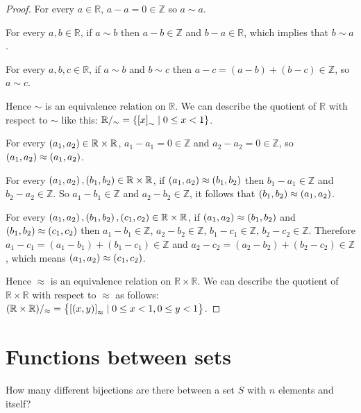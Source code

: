\begin{proof}
	For every $a\in \mathbb{R}$, $a - a = 0 \in \mathbb{Z}$ so $a\sim a$.

	For every $a, b\in\mathbb{R}$, if $a\sim b$ then $a - b\in \mathbb{Z}$ and $b - a\in \mathbb{R}$, which implies that $b\sim a$.

	For every $a, b, c\in\mathbb{R}$, if $a\sim b$ and $b\sim c$ then $a - c = (a - b) + (b - c) \in \mathbb{Z}$, so $a\sim c$.

	Hence $\sim$ is an equivalence relation on $\mathbb{R}$. We can describe the quotient of $\mathbb{R}$ with respect to $\sim$ like this: $\mathbb{R}/_{\sim} = \left\{{{[x]}_{\sim} \mid 0\leq x < 1}\right\}$.

	\bigskip
	For every $\left({a_{1}, a_{2}}\right) \in \mathbb{R}\times\mathbb{R}$, $a_{1} - a_{1} = 0\in \mathbb{Z}$ and $a_{2} - a_{2} = 0\in \mathbb{Z}$, so $\left({a_{1}, a_{2}}\right) \approx \left({a_{1}, a_{2}}\right)$.

	For every $\left({a_{1}, a_{2}}\right), \left({b_{1}, b_{2}}\right) \in \mathbb{R}\times\mathbb{R}$, if $\left({a_{1}, a_{2}}\right) \approx \left({b_{1}, b_{2}}\right)$ then $b_{1} - a_{1}\in \mathbb{Z}$ and $b_{2} - a_{2}\in \mathbb{Z}$. So $a_{1} - b_{1}\in \mathbb{Z}$ and $a_{2} - b_{2}\in \mathbb{Z}$, it follows that $\left({b_{1}, b_{2}}\right) \approx \left({a_{1}, a_{2}}\right)$.

	For every $\left({a_{1}, a_{2}}\right), \left({b_{1}, b_{2}}\right), \left({c_{1}, c_{2}}\right) \in \mathbb{R}\times\mathbb{R}$, if $\left({a_{1}, a_{2}}\right) \approx \left({b_{1}, b_{2}}\right)$ and $\left({b_{1}, b_{2}}\right) \approx \left({c_{1}, c_{2}}\right)$ then $a_{1} - b_{1} \in \mathbb{Z}$, $a_{2} - b_{2}\in \mathbb{Z}$, $b_{1} - c_{1}\in\mathbb{Z}$, $b_{2} - c_{2}\in \mathbb{Z}$. Therefore $a_{1} - c_{1} = (a_{1} - b_{1}) + (b_{1} - c_{1}) \in \mathbb{Z}$ and $a_{2} - c_{2} = (a_{2} - b_{2}) + (b_{2} - c_{2}) \in \mathbb{Z}$, which means $\left({a_{1}, a_{2}}\right) \approx \left({c_{1}, c_{2}}\right)$.

	Hence $\approx$ is an equivalence relation on $\mathbb{R}\times\mathbb{R}$. We can describe the quotient of $\mathbb{R}\times\mathbb{R}$ with respect to $\approx$ as follows: $(\mathbb{R}\times\mathbb{R})/_{\approx} = \left\{{ {[(x, y)]}_{\approx} \mid 0 \leq x < 1, 0 \leq y < 1 }\right\}$.
\end{proof}

\section{Functions between sets}

\begin{exercise}{2.1}
	How many different bijections are there between a set $S$ with $n$ elements and itself?
\end{exercise}


